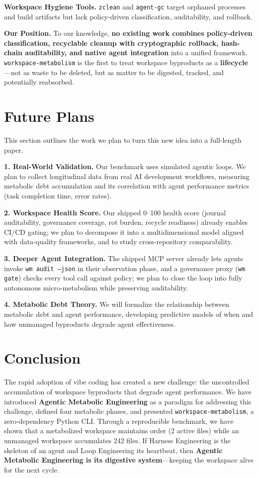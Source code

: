 \documentclass[sigconf]{acmart}
\begin{document}
\textbf{Workspace Hygiene Tools.} \texttt{zclean} \cite{zclean2026} and \texttt{agent-gc} \cite{jeong2026agentgc} target orphaned processes and build artifacts but lack policy-driven classification, auditability, and rollback.

\textbf{Our Position.} To our knowledge, \textbf{no existing work combines policy-driven classification, recyclable cleanup with cryptographic rollback, hash-chain auditability, and native agent integration} into a unified framework. \texttt{workspace-metabolism} is the first to treat workspace byproducts as a \textbf{lifecycle}---not as waste to be deleted, but as matter to be digested, tracked, and potentially reabsorbed.

\section{Future Plans}
This section outlines the work we plan to turn this new idea into a full-length paper.

\textbf{1. Real-World Validation.} Our benchmark uses simulated agentic loops. We plan to collect longitudinal data from real AI development workflows, measuring metabolic debt accumulation and its correlation with agent performance metrics (task completion time, error rates).

\textbf{2. Workspace Health Score.} Our shipped 0--100 health score (journal auditability, governance coverage, rot burden, recycle readiness) already enables CI/CD gating; we plan to decompose it into a multidimensional model aligned with data-quality frameworks, and to study cross-repository comparability.

\textbf{3. Deeper Agent Integration.} The shipped MCP server already lets agents invoke \texttt{wm audit --json} in their observation phase, and a governance proxy (\texttt{wm gate}) checks every tool call against policy; we plan to close the loop into fully autonomous micro-metabolism while preserving auditability.

\textbf{4. Metabolic Debt Theory.} We will formalize the relationship between metabolic debt and agent performance, developing predictive models of when and how unmanaged byproducts degrade agent effectiveness.

\section{Conclusion}
The rapid adoption of vibe coding has created a new challenge: the uncontrolled accumulation of workspace byproducts that degrade agent performance. We have introduced \textbf{Agentic Metabolic Engineering} as a paradigm for addressing this challenge, defined four metabolic phases, and presented \texttt{workspace-metabolism}, a zero-dependency Python CLI. Through a reproducible benchmark, we have shown that a metabolized workspace maintains order (2 active files) while an unmanaged workspace accumulates 242 files. If Harness Engineering is the skeleton of an agent and Loop Engineering its heartbeat, then \textbf{Agentic Metabolic Engineering is its digestive system}---keeping the workspace alive for the next cycle.
\end{document}
